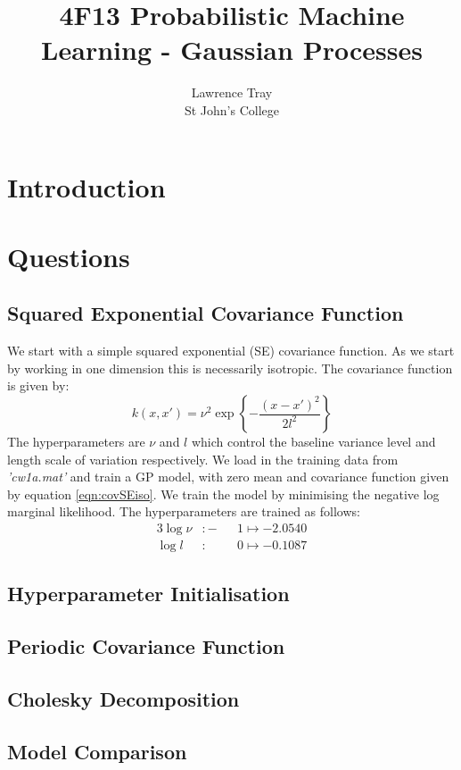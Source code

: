 \documentclass[]{article}
\title{4F13 Probabilistic Machine Learning - Gaussian Processes}
\author{Lawrence Tray \\ St John's College}
\begin{document}
\maketitle

\begin{abstract}
\end{abstract}

\section{Introduction}

\section{Questions}
\subsection{Squared Exponential Covariance Function}
We start with a simple squared exponential (SE) covariance function. As we start by working in one dimension this is necessarily isotropic. The covariance function is given by:
%
\begin{equation}
k(x, x') = \nu^2 \exp\left\{- \frac{(x-x')^2}{2l^2}\right\}
\label{eqn:covSEiso}
\end{equation}
%
The hyperparameters are $\nu$ and $l$ which control the baseline variance level and length scale of variation respectively. We load in the training data from \textit{'cw1a.mat'} and train a GP model, with zero mean and covariance function given by equation \ref{eqn:covSEiso}. We train the model by minimising the negative log marginal likelihood. The hyperparameters are trained as follows:
%
\begin{alignat}{3}
\log \nu &: -&&1 \mapsto -2.0540 \\
\log l &: &&0 \mapsto -0.1087
\end{alignat}

\subsection{Hyperparameter Initialisation}
\subsection{Periodic Covariance Function}
\subsection{Cholesky Decomposition}
\subsection{Model Comparison}
\end{document}
